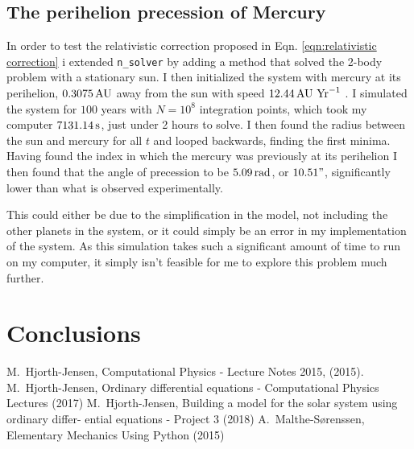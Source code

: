 \documentclass[10pt,showpacs,preprintnumbers,amsmath,amssymb,nofootinbib,aps,prl,twocolumn,groupedaddress,superscriptaddress,showkeys]{revtex4-1}
\begin{document}
\subsection{The perihelion precession of Mercury}
  In order to test the relativistic correction proposed in Eqn. \ref{eqn:relativistic correction} i extended \lstinline{n_solver} by adding a method that solved the 2-body problem with a stationary sun. I then initialized the system with mercury at its perihelion, $0.3075\,\textup{AU}$ away from the sun with speed $12.44\, \textup{AU Yr}^{-1}$ \cite{problem_set}. I simulated the system for $100$ years with $N=10^8$ integration points, which took my computer $7131.14\,\textup s$, just under 2 hours to solve. I then found the radius between the sun and mercury for all $t$ and looped backwards, finding the first minima. Having found the index in which the mercury was previously at its perihelion I then found that the angle of precession to be $5.09\,\textup{rad}$, or $10.51"$, significantly lower than what is observed experimentally.

  This could either be due to the simplification in the model, not including the other planets in the system, or it could simply be an error in my implementation of the system. As this simulation takes such a significant amount of time to run on my computer, it simply isn't feasible for me to explore this problem much further.




\section{Conclusions}


\begin{thebibliography}{99}
 M.~Hjorth-Jensen, Computational Physics - Lecture Notes 2015, (2015).
 M.~Hjorth-Jensen, Ordinary differential equations - Computational Physics Lectures (2017)
 M.~Hjorth-Jensen, Building a model for the solar system using ordinary differ-
ential equations - Project 3 (2018)
 A.~Malthe-Sørenssen, Elementary Mechanics Using Python (2015)
\end{thebibliography}

\appendix
\end{document}
